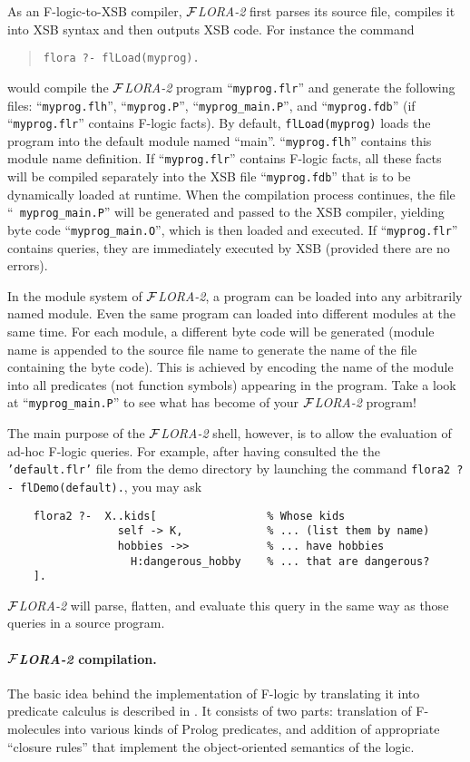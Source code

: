 \documentclass[11pt]{article}
\newcommand{\FLORA}{{\mbox{${\cal F}${\small\it LORA}\rm\emph{-2}}}\xspace}
\newcommand{\fl}{\mbox{F-logic}\xspace}
\begin{document}
As an \fl-to-XSB compiler, \FLORA first parses its source file,
compiles it into XSB syntax and then outputs XSB code. For instance the command
\begin{quote}
\verb|flora ?- flLoad(myprog).|
\end{quote}
would compile the \FLORA program ``{\tt myprog.flr}'' and generate the
following files: ``{\tt myprog.flh}'', ``{\tt myprog.P}'',
``{\tt myprog\_main.P}'', and ``{\tt myprog.fdb}'' (if ``{\tt myprog.flr}''
contains \fl facts).  By default, {\tt flLoad(myprog)} loads the
program into the default module named ``main''. ``{\tt myprog.flh}''
contains this module name definition.  If ``{\tt myprog.flr}''
contains \fl facts, all these facts will be compiled separately into
the XSB file ``{\tt myprog.fdb}'' that is to be dynamically loaded at
runtime. When the compilation process continues, the file ``{\tt
myprog\_main.P}'' will be generated and passed to the XSB compiler,
yielding byte code ``{\tt myprog\_main.O}'', which is then loaded and
executed.  If ``{\tt myprog.flr}'' contains queries, they are
immediately executed by XSB (provided there are no errors).

In the module system of \FLORA, a program can be loaded into any
arbitrarily named module. Even the same program can loaded into
different modules at the same time. For each module, a different byte
code will be generated (module name is appended to the source file
name to generate the name of the file containing the byte code). This
is achieved by encoding the name of the module into all predicates
(not function symbols) appearing in the program. Take a look at
``{\tt myprog\_main.P}'' to see what has become of your \FLORA program!

The main purpose of the \FLORA shell, however, is to allow the evaluation
of ad-hoc \fl queries. For example, after having consulted the
the \texttt{'default.flr'} file from the demo directory by launching
the command \texttt{flora2~?-~flDemo(default).}, you may ask
\begin{verbatim}
    flora2 ?-  X..kids[                 % Whose kids
                 self -> K,             % ... (list them by name)
                 hobbies ->>            % ... have hobbies
                   H:dangerous_hobby    % ... that are dangerous?
    ]. 
\end{verbatim}
\FLORA will parse, flatten, and evaluate this query in the same way as
those queries in a source program.


\paragraph{\FLORA compilation.}
The basic idea behind the implementation of \fl by translating it into
predicate calculus is described in \cite{KLW95}. It consists of two parts:
translation of F-molecules into various kinds of Prolog predicates, and
addition of appropriate ``closure rules'' that implement the
object-oriented semantics of the logic.
\end{document}
